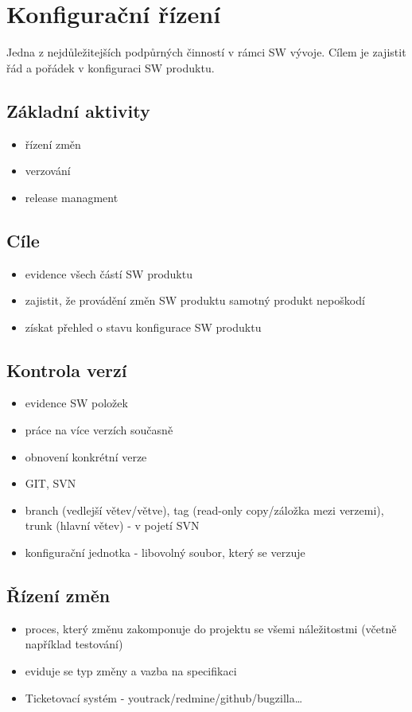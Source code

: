 \documentclass{szzclass}
\begin{document}
\tableofcontents
\newpage

\section{Konfigurační řízení}
Jedna z nejdůležitejších podpůrných činností v rámci SW vývoje. Cílem je zajistit řád a pořádek v konfiguraci SW produktu.
\subsection{Základní aktivity}
\begin{itemize}
  \item řízení změn
  \item verzování
  \item release managment
\end{itemize}
\subsection{Cíle}
\begin{itemize}
  \item evidence všech částí SW produktu
  \item zajistit, že provádění změn SW produktu samotný produkt nepoškodí
  \item získat přehled o stavu konfigurace SW produktu
\end{itemize}
\subsection{Kontrola verzí}
\begin{itemize}
  \item evidence SW položek
  \item práce na více verzích současně
  \item obnovení konkrétní verze
  \item GIT, SVN
  \item branch (vedlejší větev/větve), tag (read-only copy/záložka mezi verzemi), trunk (hlavní větev) - v pojetí SVN
  \item konfigurační jednotka - libovolný soubor, který se verzuje
\end{itemize}
\subsection{Řízení změn}
\begin{itemize}
  \item proces, který změnu zakomponuje do projektu se všemi náležitostmi (včetně například testování)
  \item eviduje se typ změny a vazba na specifikaci
  \item Ticketovací systém - youtrack/redmine/github/bugzilla\dots
\end{itemize}
\end{document}
